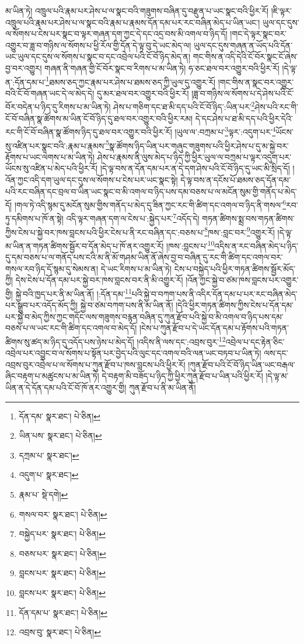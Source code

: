 མ་ཡིན་ཏེ། འཁྲུལ་པའི་རྣམ་པར་ཤེས་པ་ལ་སྣང་བའི་གཟུགས་བཞིན་དུ་བརྫུན་པ་ཡང་སྣང་བའི་ཕྱིར་རོ། །ཇི་ལྟར་འཁྲུལ་པའི་རྣམ་པར་ཤེས་པ་ལ་སྣང་བའི་རྣམ་པ་རྣམས་དོན་དམ་པར་རང་བཞིན་མེད་པ་ཡིན་ཡང་། ཡུལ་དང་དུས་ལ་སོགས་པ་ངེས་པར་སྣང་བ་ལྟར་གཞན་དག་ཀྱང་དེ་དང་འདྲ་བས་མི་འགལ་བ་ཉིད་དོ། །གང་དེ་ལྟར་སྣང་བར་འགྱུར་བ་ཟླ་བ་གཉིས་ལ་སོགས་པ་ཕྱི་རོལ་གྱི་དོན་དེ་ལྟ་བུ་དེ་ཡང་མེད་ལ། ཡུལ་དང་དུས་གཞན་ན་ཡོད་པའི་དོན་ཡང་ཡུལ་དང་དུས་ལ་སོགས་པ་སྣང་བ་དང་འབྲེལ་པའི་ངོ་བོ་ཉིད་མེད་ན། གང་གིས་ན་འདི་དེའི་ངོ་བོར་སྣང་ངོ་ཞེས་བྱ་བར་འགྱུར། གཞན་ནི་གཞན་གྱི་ངོ་བོར་སྣང་བ་རིགས་པ་མ་ཡིན་ཏེ། ཧ་ཅང་ཐལ་བར་འགྱུར་བའི་ཕྱིར་རོ། །དེ་ལྟ་ན་:དོན་དམ་པ་\footnote{དོན་དམ་  སྣར་ཐང་།  པེ་ཅིན། }ཐམས་ཅད་ཀྱང་རྣམ་པར་ཤེས་པ་ཐམས་ཅད་ཀྱི་ཡུལ་དུ་འགྱུར་རོ། །གང་གིས་ན་སྣང་བར་འགྱུར་བའི་ངོ་བོ་གཞན་ཡང་དེ་ལ་མེད་དེ། དུ་མར་ཐལ་བར་འགྱུར་བའི་ཕྱིར་རོ། །ཟླ་བ་གཉིས་ལ་སོགས་པ་དེ་ཤེས་པའི་ངོ་བོར་བདེན་པ་ཉིད་དུ་རིགས་པ་མ་ཡིན་ཏེ། ཤེས་པ་གཅིག་དང་ཐ་མི་དད་པའི་ངོ་བོ་ཉིད་:ཡིན་པར་\footnote{ཡིན་པས་  སྣར་ཐང་།  པེ་ཅིན། }ཤེས་པའི་རང་གི་ངོ་བོ་བཞིན་སྣ་ཚོགས་མ་ཡིན་ངོ་བོ་ཉིད་དུ་ཐལ་བར་འགྱུར་བའི་ཕྱིར་རམ། དེ་དང་ཤེས་པ་ཐ་མི་དད་པའི་ཕྱིར་དེའི་རང་གི་ངོ་བོ་བཞིན་སྣ་ཚོགས་ཉིད་དུ་ཐལ་བར་འགྱུར་བའི་ཕྱིར་རོ། །ཡུལ་ལ་:བཀྲམ་པ་\footnote{དཀྲམ་པ་  སྣར་ཐང་། }ལྟར་:འདུག་པར་\footnote{འདུག་པ་  སྣར་ཐང་། }ཡོངས་སུ་འཛིན་པར་སྣང་བའི་:རྣམ་པ་རྣམས་\footnote{རྣམ་པ་  སྡེ་དགེ། }སྣ་ཚོགས་ཉིད་ཡིན་པར་གཞུང་གཟུགས་པའི་ཕྱིར་ཤེས་པ་དུ་མ་སྐྱེ་བར་རྟོགས་པ་ཡང་ལེགས་པ་མ་ཡིན་ཏེ། ཤེས་པ་རྣམས་ནི་ལུས་མེད་པ་ཉིད་ཀྱི་ཕྱིར་ཡུལ་ལ་བཀྲམ་པ་ལྟར་འདུག་པར་ཡོངས་སུ་འཛིན་པ་མེད་པའི་ཕྱིར་རོ། །དེ་ལྟ་བས་ན་དོན་དམ་པར་ན་དེ་དག་ཤེས་པའི་ངོ་བོ་ཉིད་དུ་ཡང་མི་སྲིད་དོ། །འོན་ཀྱང་འདི་དག་ཡུལ་དང་དུས་ལ་སོགས་པ་ངེས་པར་ཡང་སྣང་སྟེ། དེ་ལྟ་བས་ན་དངོས་པོ་ཐམས་ཅད་དོན་དམ་པའི་རང་བཞིན་དང་བྲལ་བ་ཡིན་ཡང་སྣང་བ་མི་འགལ་བ་ཉིད་པས་དམ་བཅས་པ་ལ་མངོན་སུམ་གྱི་གནོད་པ་མེད་དོ། །གལ་ཏེ་འདི་སྙམ་དུ་མངོན་སུམ་གྱིས་གནོད་པ་མེད་དུ་ཟིན་ཀྱང་རང་གི་ཚིག་དང་འགལ་བ་ཉིད་ནི་གསལ་\footnote{གསལ་བར་  སྣར་ཐང་།  པེ་ཅིན། }རབ་ཏུ་དམིགས་པ་ཁོ་ན་སྟེ། འདི་ལྟར་གཞན་དག་ལ་ངེས་པ་:སྐྱེད་པར་\footnote{བསྐྱེད་པར་  སྣར་ཐང་།  པེ་ཅིན། }འདོད་དེ། གཏན་ཚིགས་སྨྲ་བས་གཏན་ཚིགས་ཀྱིས་ངེས་པ་སྐྱེ་བར་ཁས་བླངས་པའི་ཕྱིར་ངེས་པ་ནི་རང་བཞིན་དང་:བཅས་པ་\footnote{བཅས་པར་  སྣར་ཐང་།  པེ་ཅིན། }ཁས་:བླང་བར་\footnote{བླངས་པར་  སྣར་ཐང་།  པེ་ཅིན། }འགྱུར་རོ། །དེ་ལྟ་མ་ཡིན་ན་གཏན་ཚིགས་སྦྱོར་བ་དོན་མེད་པ་ཁོ་ནར་འགྱུར་རོ། །ཁས་:བླངས་པ་\footnote{བླངས་པར་  སྣར་ཐང་།  པེ་ཅིན། }འདིས་ན་རང་བཞིན་མེད་པ་ཉིད་དུ་དམ་བཅས་པ་ལ་གནོད་པས་ངའི་མ་ནི་མོ་གཤམ་ཡིན་ནོ་ཞེས་བྱ་བ་བཞིན་དུ་རང་གི་ཚིག་དང་འགལ་བར་གསལ་རབ་ཉིད་དོ་སྙམ་དུ་སེམས་ན། དེ་ཡང་རིགས་པ་མ་ཡིན་ཏེ། ངེས་པ་བསྐྱེད་པའི་ཕྱིར་གཏན་ཚིགས་སྦྱོར་མོད་ཀྱི། དེས་ངེས་པ་དོན་དམ་པར་སྐྱེ་བར་ཁས་བླངས་བར་ནི་མི་འགྱུར་རོ། །འོན་ཀྱང་སྐྱེ་བ་ཙམ་ཁས་བླངས་པར་འགྱུར་གྱི། སྐྱེ་བའི་ཁྱད་པར་ནི་མ་ཡིན་ནོ། །:དོན་དམ་\footnote{དོན་དམ་པ་  སྣར་ཐང་།  པེ་ཅིན། }པའི་སྐྱེ་བ་བཀག་པས་ནི་འདིར་དོན་དམ་པ་པར་རང་བཞིན་མེད་པར་སྒྲུབ་པར་འདོད་མོད་ཀྱི། སྐྱེ་བ་ཙམ་བཀག་པས་ནི་མ་ཡིན་ནོ། །དེའི་ཕྱིར་གཏན་ཚིགས་ཀྱིས་ངེས་པ་དོན་དམ་པར་སྐྱེ་བ་མེད་ཀྱིས་ཀྱང་གདོང་ལས་གཟུགས་བརྙན་བཞིན་དུ་ཀུན་རྫོབ་པའི་སྐྱེ་བ་མི་འགལ་བ་ཉིད་པས་དམ་བཅས་པ་ལ་ཡང་རང་གི་ཚིག་དང་འགལ་བ་མེད་དོ། །ངེས་པ་ཀུན་རྫོབ་པ་དེ་ཡང་དོན་དམ་པ་རྟོགས་པའི་གཏན་ཚིགས་སུ་ཚད་མ་ཉིད་དུ་འདོད་པས་ཉེས་པ་མེད་དོ། །འདིས་ནི་ལས་དང་:འབྲས་བུར་\footnote{འབྲས་བུ་  སྣར་ཐང་།  པེ་ཅིན། }འབྲེལ་པ་དང་རྟེན་ཅིང་འབྲེལ་པར་འབྱུང་བ་ལ་སོགས་པ་སྟོན་པར་བྱེད་པའི་ལུང་དང་འགལ་བའི་ལན་ཡང་བཏབ་པ་ཡིན་ཏེ། ལས་དང་འབྲས་བུར་འབྲེལ་པ་ལ་སོགས་པ་ཀུན་རྫོབ་པ་ཁས་བླངས་པའི་ཕྱིར་རོ། །ཀུན་རྫོབ་པའི་ངོ་བོ་ཉིད་ཡིན་ཡང་བརྒལ་ཞིང་བརྟག་པ་མཚུངས་པ་མ་ཡིན་ཏེ། དེ་བརྟག་མི་བཟོད་པ་ཉིད་ཀྱི་ཕྱིར་ཀུན་རྫོབ་པ་ཡིན་པའི་ཕྱིར་རོ། །དེ་ལྟ་མ་ཡིན་ན་དེ་དོན་དམ་པའི་ངོ་བོ་ཁོ་ནར་འགྱུར་གྱི། ཀུན་རྫོབ་པ་ནི་མ་ཡིན་ནོ། 